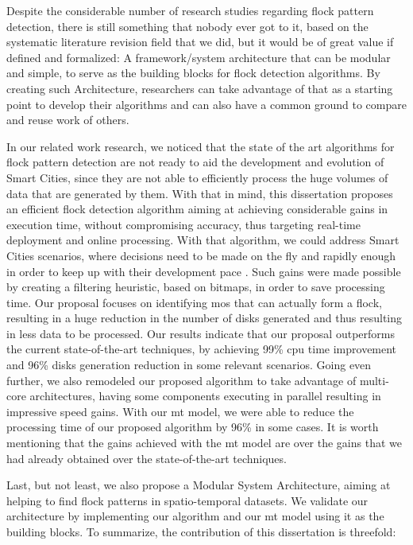Despite the considerable number of research studies regarding flock pattern detection, there is still something that
nobody ever got to it, based on the systematic literature revision field that we did, but it would be of great value if
defined and formalized: A framework/system architecture that can be modular and simple, to serve as the building blocks
for flock detection algorithms. By creating such Architecture, researchers can take advantage of that as a starting
point to develop their algorithms and can also have a common ground to compare and reuse work of others.

In our related work research, we noticed that the state of the art algorithms for flock pattern detection are not ready
to aid the development and evolution of Smart Cities, since they are not able to efficiently process the huge volumes of
data that are generated by them. With that in mind, this dissertation proposes an efficient flock detection algorithm
aiming at achieving considerable gains in execution time, without compromising accuracy, thus targeting real-time
deployment and online processing. With that algorithm, we could address Smart Cities scenarios, where decisions need to
be made on the fly and rapidly enough in order to keep up with their development pace
\citep{ieeesmartcities}\citep{springersmartcities}. Such gains were made possible by creating a filtering heuristic,
based on bitmaps, in order to save processing time. Our proposal focuses on identifying \acp{mo} that can actually form
a flock, resulting in a huge reduction in the number of disks generated and thus resulting in less data to be processed.
Our results indicate that our proposal outperforms the current state-of-the-art techniques, by achieving 99\% \ac{cpu}
time improvement and 96\% disks generation reduction in some relevant scenarios. Going even further, we also remodeled
our proposed algorithm to take advantage of multi-core architectures, having some components executing in parallel
resulting in impressive speed gains. With our \ac{mt} model, we were able to reduce the processing time of our proposed
algorithm by 96\% in some cases. It is worth mentioning that the gains achieved with the \ac{mt} model are over the
gains that we had already obtained over the state-of-the-art techniques.

Last, but not least, we also propose a Modular System Architecture, aiming at helping to find flock patterns in
spatio-temporal datasets. We validate our architecture by implementing our algorithm and our \ac{mt} model using it as
the building blocks. To summarize, the contribution of this dissertation is threefold:

